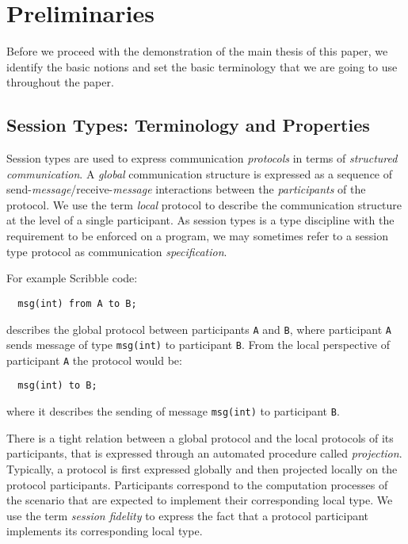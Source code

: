 \section{Preliminaries}

Before we proceed with the demonstration of the main thesis
of this paper, we identify the basic notions and set the basic
terminology that we are going to use throughout the paper.

\subsection{Session Types: Terminology and Properties}

Session types are used to express communication
{\em protocols} in terms of {\em structured communication}.
A {\em global} communication structure is expressed 
as a sequence of send-{\em message}/receive-{\em message}
interactions between the {\em participants} of the protocol.
We use the term {\em local} protocol to describe
the communication structure at the level of a single participant.
As session types is a type discipline with the requirement to
be enforced on a program, we may sometimes refer to a session type
protocol as communication {\em specification}.

For example Scribble code:
%
\begin{lstlisting}
  msg(int) from A to B;
\end{lstlisting}
%
describes the global protocol between participants \lstinline|A| and \lstinline|B|,
where participant \lstinline|A| sends message of type \lstinline|msg(int)|
to participant \lstinline|B|. From the local perspective of participant
\lstinline|A| the protocol would be:
%
\begin{lstlisting}
  msg(int) to B;
\end{lstlisting}
%
where it describes the sending of message \lstinline|msg(int)|
to participant \lstinline|B|.

There is a tight relation between a global protocol and the
local protocols of its participants, that is expressed
through an automated procedure called {\em projection}.
Typically, a protocol is first expressed globally and then
projected locally on the protocol participants. Participants
correspond to the computation processes of the scenario
that are expected to implement their corresponding local type.
We use the term {\em session fidelity} to express the fact
that a protocol participant implements its corresponding local type.

